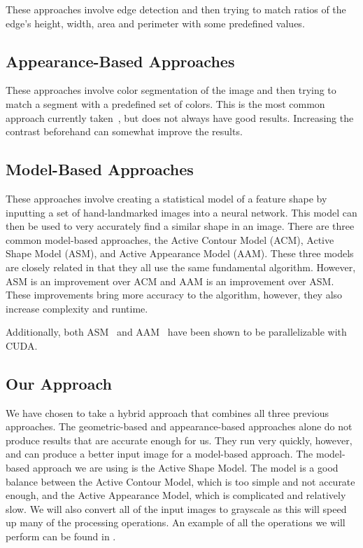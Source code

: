These approaches involve edge detection and then trying to match ratios of the edge's height, width, area and perimeter with some predefined values.

\subsection{Appearance-Based Approaches}

These approaches involve color segmentation of the image and then trying to match a segment with a predefined set of colors. 
This is the most common approach currently taken~\cite{Stillittano13}\cite{Yang09}, but does not always have good results. Increasing the contrast beforehand can somewhat improve the results.

\subsection{Model-Based Approaches}

These approaches involve creating a statistical model of a feature shape by inputting a set of hand-landmarked images into a neural network.
This model can then be used to very accurately find a similar shape in an image. 
There are three common model-based approaches, the Active Contour Model (ACM), Active Shape Model (ASM), and Active Appearance Model (AAM).
These three models are closely related in that they all use the same fundamental algorithm. However, ASM is an improvement over ACM and AAM is an improvement over ASM. These improvements bring more accuracy to the algorithm, however, they also increase complexity and runtime.

Additionally, both ASM~\cite{Li09} and AAM~\cite{Wang14} have been shown to be parallelizable with CUDA.
	

\subsection{Our Approach}

We have chosen to take a hybrid approach that combines all three previous approaches. The geometric-based and appearance-based approaches alone do not produce results that are accurate enough for us. They run very quickly, however, and can produce a better input image for a model-based approach. The model-based approach we are using is the Active Shape Model. The model is a good balance between the Active Contour Model, which is too simple and not accurate enough, and the Active Appearance Model, which is complicated and relatively slow. We will also convert all of the input images to grayscale as this will speed up many of the processing operations. An example of all the operations we will perform can be found in .


